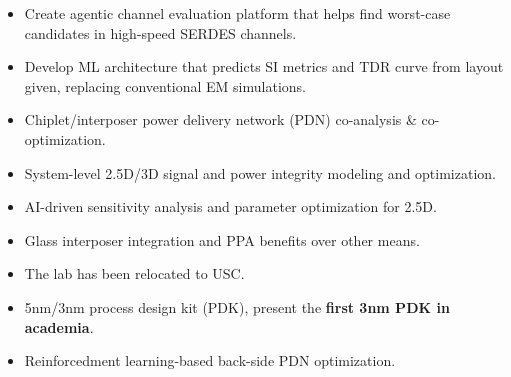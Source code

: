 


\begin{itemize}
    \item Create agentic channel evaluation platform that helps find worst-case candidates in high-speed SERDES channels.
    \item Develop ML architecture that predicts SI metrics and TDR curve from layout given, replacing conventional EM simulations.
\end{itemize}

\vspace{-5pt}
\divider
\vspace{-2.5pt}

\begin{itemize}
    \item Chiplet/interposer power delivery network (PDN) co-analysis \& co-optimization.
    \item System-level 2.5D/3D signal and power integrity modeling and optimization.
\end{itemize}

\vspace{-5pt}
\divider
\vspace{-2.5pt}

\begin{itemize}
    \item AI-driven sensitivity analysis and parameter optimization for 2.5D.
    \item Glass interposer integration and PPA benefits over other means. 
    \item The lab has been relocated to USC.
\end{itemize}

\vspace{-5pt}
\divider
\vspace{-2.5pt}

\begin{itemize}
    \item 5nm/3nm process design kit (PDK), present the \textbf{first 3nm PDK in academia}.
    \item Reinforcedment learning-based back-side PDN optimization. 
\end{itemize}

